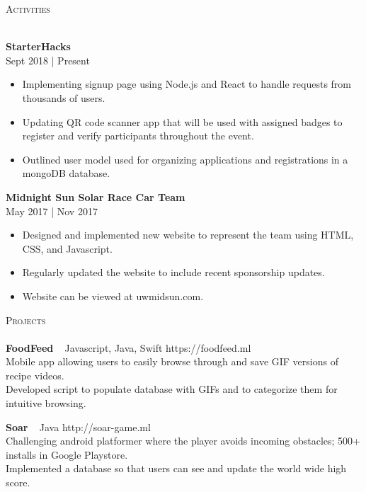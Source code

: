 \documentclass[a4paper]{article}
\newcommand{\lineunder} {
    \vspace*{-8pt} \\
    \hspace*{-18pt} \hrulefill \\
}
\newcommand{\header} [1] {
    {\hspace*{-18pt}\vspace*{6pt} \textsc{#1}}
    \vspace*{-6pt} \lineunder
}
\begin{document}
\header{Activities}
\vspace{1mm}

\textbf{StarterHacks} \hfill \\
 \hfill Sept 2018 | Present\\
\vspace{-1mm}
\begin{itemize} \itemsep 1pt
	\item Implementing signup page using Node.js and React to handle requests from thousands of users.
	\item Updating QR code scanner app that will be used with assigned badges to register and verify participants throughout the event.
	\item Outlined user model used for organizing applications and registrations in a mongoDB database.
\end{itemize}

\textbf{Midnight Sun Solar Race Car Team}\\
 \hfill May 2017 | Nov 2017\\
\vspace{-1mm}
\begin{itemize} \itemsep 1pt
	\item Designed and implemented new website to represent the team using HTML, CSS, and Javascript.
	\item Regularly updated the website to include recent sponsorship updates.
	\item Website can be viewed at uwmidsun.com.
\end{itemize}

\header{Projects}

{\textbf{FoodFeed}} {\ \textbar{} Javascript, Java, Swift} \hfill https://foodfeed.ml\\
Mobile app allowing users to easily browse through and save GIF versions of recipe videos.\\
Developed script to populate database with GIFs and to categorize them for intuitive browsing. \\
\vspace*{2mm}

{\textbf{Soar}} {\ \textbar{} Java} \hfill http://soar-game.ml\\
Challenging android platformer where the player avoids incoming obstacles; 500+ installs in Google Playstore.\\
Implemented a database so that users can see and update the world wide high score.\\
\vspace*{2mm}
\end{document}
